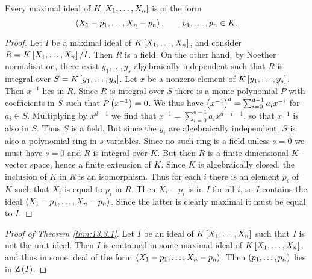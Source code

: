 \begin{corollary}
Every maximal ideal of $ K\sbr{X_1, \dots, X_n} $ is of the form
$$ \left\langle X_1 - p_1, \dots, X_n - p_n \right\rangle, \qquad p_1, \dots, p_n \in K. $$
\end{corollary}

\begin{proof}
Let $ I $ be a maximal ideal of $ K\sbr{X_1, \dots, X_n} $, and consider $ R = K\sbr{X_1, \dots, X_n} / I $. Then $ R $ is a field. On the other hand, by Noether normalisation, there exist $ y_1, \dots, y_s $ algebraically independent such that $ R $ is integral over $ S = K\sbr{y_1, \dots, y_s} $. Let $ x $ be a nonzero element of $ K\sbr{y_1, \dots, y_s} $. Then $ x^{-1} $ lies in $ R $. Since $ R $ is integral over $ S $ there is a monic polynomial $ P $ with coefficients in $ S $ such that $ P\br{x^{-1}} = 0 $. We thus have $ \br{x^{-1}}^d = \sum_{i = 0}^{d - 1} a_ix^{-i} $ for $ a_i \in S $. Multiplying by $ x^{d - 1} $ we find that $ x^{-1} = \sum_{i = 0}^{d - 1} a_ix^{d - i - 1} $, so that $ x^{-1} $ is also in $ S $. Thus $ S $ is a field. But since the $ y_i $ are algebraically independent, $ S $ is also a polynomial ring in $ s $ variables. Since no such ring is a field unless $ s = 0 $ we must have $ s = 0 $ and $ R $ is integral over $ K $. But then $ R $ is a finite dimensional $ K $-vector space, hence a finite extension of $ K $. Since $ K $ is algebraically closed, the inclusion of $ K $ in $ R $ is an isomorphism. Thus for each $ i $ there is an element $ p_i $ of $ K $ such that $ X_i $ is equal to $ p_i $ in $ R $. Then $ X_i - p_i $ is in $ I $ for all $ i $, so $ I $ contains the ideal $ \left\langle X_1 - p_1, \dots, X_n - p_n \right\rangle $. Since the latter is clearly maximal it must be equal to $ I $.
\end{proof}

\begin{proof}[Proof of Theorem \ref{thm:13.3.1}]
Let $ I $ be an ideal of $ K\sbr{X_1, \dots, X_n} $ such that $ I $ is not the unit ideal. Then $ I $ is contained in some maximal ideal of $ K\sbr{X_1, \dots, X_n} $, and thus in some ideal of the form $ \left\langle X_1 - p_1, \dots, X_n - p_n \right\rangle $. Then $ \br{p_1, \dots, p_n} $ lies in $ \Z\br{I} $.
\end{proof}

